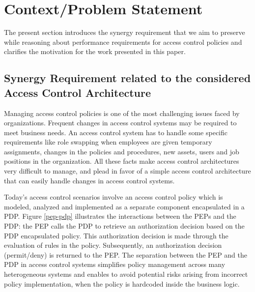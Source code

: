 




\section{Context/Problem Statement} \label{sec:context}
The present section introduces the synergy requirement that we aim to 
preserve while reasoning about performance requirements for access control policies and clarifies the motivation for the work presented in this paper.

\subsection{Synergy Requirement related to the considered Access Control Architecture}

Managing access control policies is one of the most challenging issues faced by organizations. 
Frequent changes in access control systems may be required to meet business needs. An access control system has to handle some specific 
requirements like role swapping when employees are given temporary assignments, changes in the policies and procedures, 
new assets, users and job positions in the organization.
All these facts make access control architectures very difficult to manage, and plead in favor of a simple access control architecture that can easily 
handle changes in access control systems. 

Today's access control scenarios involve an access control policy which is modeled, analyzed and implemented as a separate component 
encapsulated in a PDP. Figure \ref{pep-pdp} illustrates the interactions between the PEPs and the PDP: the PEP calls the PDP to 
retrieve an authorization decision based on the PDP encapsulated policy. This authorization decision is made through the evaluation of rules in the policy. 
Subsequently, an authorization decision (permit/deny) is returned to the PEP.
The separation between the PEP and the PDP in access control systems simplifies policy management across many heterogeneous systems and enables to avoid
 potential risks arising from incorrect policy implementation, when the policy is hardcoded inside the business logic.


